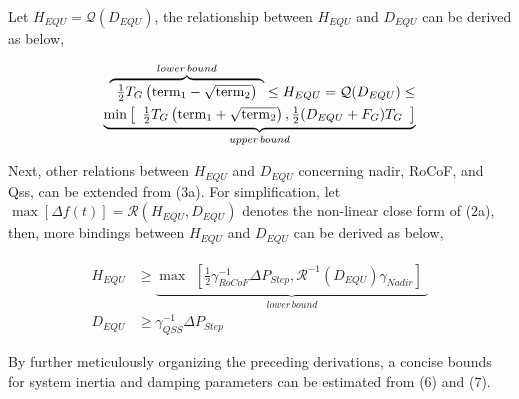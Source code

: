 \documentclass[lettersize,journal]{IEEEtran}
\begin{document}
Let $H_{EQU}=\mathcal{Q} (D_{EQU})$, the relationship between $H_{EQU}$ and $D_{EQU}$ can be derived as below,

\begin{subequations}
  \begin{align}
    \overbrace{\begin{array}{l}\frac{1}{2}T_G \left(\text{term}_1 - \sqrt{\text{term}_2} \right)\end{array}}^{lower\,bound} \leq H_{EQU}=\mathcal{Q} (D_{EQU}) \leq \notag \\
    \underbrace{\min \left [
    \begin{array}{l}
      \frac{1}{2}T_G \left(\text{term}_1 + \sqrt{\text{term}_2}\right), \frac{1}{2} (D_{EQU} + F_G) T_{G}\\
    \end{array} \right ]
    }_{upper\, bound}
    \end{align}
  \end{subequations}

Next, other relations between $H_{EQU}$ and $D_{EQU}$ concerning nadir, RoCoF, and Qss, can be extended from (3a). For simplification, let $\max [ \varDelta f(t)]=\mathcal{R} (H_{EQU}, D_{EQU})$ denotes the non-linear close form of (2a), then, more bindings between $H_{EQU}$ and $D_{EQU}$ can be derived as below,

\begin{subequations}
  \begin{align}
H_{EQU} &\!\geq\! \underbrace{\max\!\!\! \begin{array}{l}[\frac{1}{2} \gamma_{RoCoF}^{-1} \varDelta P_{Step},\mathcal{R}^{-1}(D_{EQU}) \gamma_{Nadir}]\end{array}}_{lower\, bound} \\
D_{EQU} & \geq \gamma_{QSS}^{-1} \varDelta P_{Step}
  \end{align}
\end{subequations}

By further meticulously organizing the preceding derivations, a concise bounds for system inertia and damping parameters can be estimated from (6) and (7).
\end{document}
